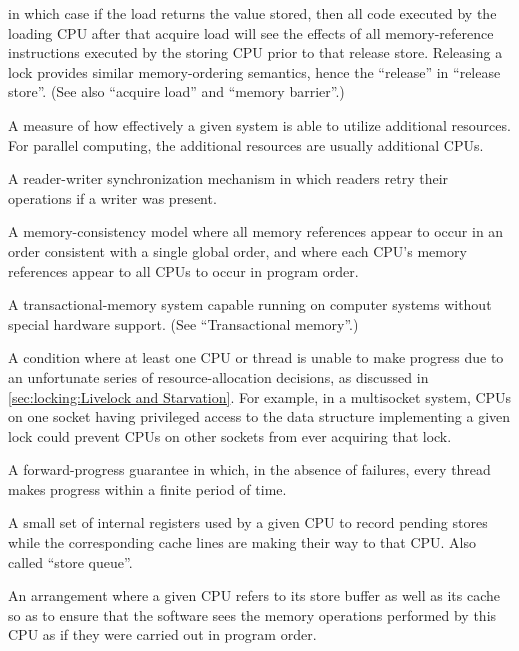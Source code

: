 \begin{description}
	in which case if the load returns the value stored, then all
	code executed by the loading CPU after that acquire load will
	see the effects of all memory-reference instructions executed
	by the storing CPU prior to that release store.
	Releasing a lock provides similar memory-ordering semantics,
	hence the ``release'' in ``release store''.
	(See also ``acquire load'' and ``memory barrier''.)
\item[\IXG{Scalability}:]
	A measure of how effectively a given system is able to utilize
	additional resources.
	For parallel computing, the additional resources are usually
	additional CPUs.
\item[\IXGh{Sequence}{Lock}:]
	A reader-writer synchronization mechanism in which readers
	retry their operations if a writer was present.
\item[\IXGalth{Sequential Consistency}{sequential}{memory consistency}:]
	A memory-consistency model where all memory references appear to occur
	in an order consistent with
	a single global order, and where each CPU's memory references
	appear to all CPUs to occur in program order.
\item[Software Transactional Memory (HTM):]
	A transactional-memory system capable running on computer systems
	without special hardware support.
	(See ``Transactional memory''.)
\item[\IXG{Starvation}:]
	A condition where at least one CPU or thread is unable to make
	progress due to an unfortunate series of resource-allocation
	decisions, as discussed in
	\cref{sec:locking:Livelock and Starvation}.
	For example, in a multisocket system, CPUs on one socket having
	privileged access to the data structure implementing a given lock
	could prevent CPUs on other sockets from ever acquiring that lock.
\item[\IXG{Starvation Free}:]
	A forward-progress guarantee in which, in the absence of
	failures, every thread makes progress within a finite
	period of time.
\item[\IXG{Store Buffer}:]
	A small set of internal registers used by a given CPU
	to record pending stores
	while the corresponding cache lines are making their
	way to that CPU\@.
	Also called ``store queue''.
\item[\IXG{Store Forwarding}:]
	An arrangement where a given CPU refers to its store buffer
	as well as its cache so as to ensure that the software sees
	the memory operations performed by this CPU as if they
	were carried out in program order.
\item[\IXGr{Superscalar CPU}:]

\end{description}
